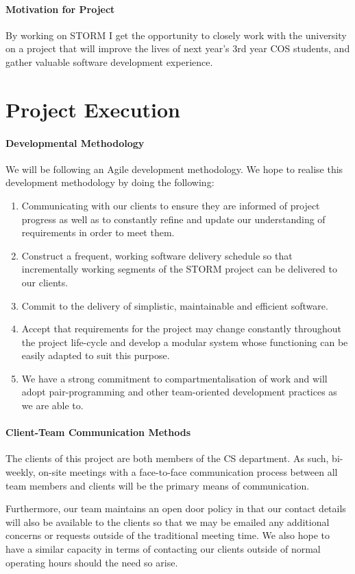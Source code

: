 \documentclass[12pt]{article}
\begin{document}
\paragraph{Motivation for Project}
By working on STORM I get the opportunity to closely work with the university on a project that will improve the lives of next year's 3rd year COS students, and gather valuable software development experience.

\section{Project Execution}
\paragraph{Developmental Methodology}
We will be following an Agile development methodology. We hope to realise this development methodology by doing the following:
\begin{enumerate}
\item Communicating with our clients to ensure they are informed of project progress as well as to constantly refine and update our understanding of requirements in order to meet them.
\item Construct a frequent, working software delivery schedule so that incrementally working segments of the STORM project can be delivered to our clients.
\item Commit to the delivery of simplistic, maintainable and efficient software.
\item Accept that requirements for the project may change constantly throughout the project life-cycle and develop a modular system whose functioning can be easily adapted to suit this purpose.
\item We have a strong commitment to compartmentalisation of work and will adopt pair-programming and other team-oriented development practices as we are able to.
\end{enumerate}

\paragraph{Client-Team Communication Methods}
The clients of this project are both members of the CS department. As such, bi-weekly, on-site meetings with a face-to-face communication process between all team members and clients will be the primary means of communication.

Furthermore, our team maintains an open door policy in that our contact details will also be available to the clients so that we may be emailed any additional concerns or requests outside of the traditional meeting time. We also hope to have a similar capacity in terms of contacting our clients outside of normal operating hours should the need so arise.
\end{document}
